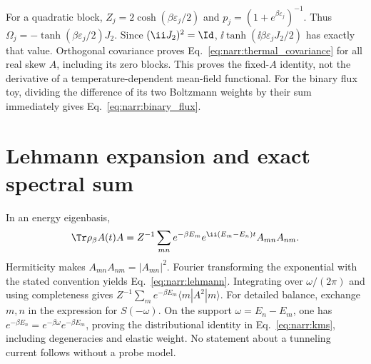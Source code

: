 For a quadratic block, $Z_j=2\cosh(\beta\varepsilon_j/2)$ and
$p_j=(1+e^{\beta\varepsilon_j})^{-1}$. Thus
$\Omega_j=-\tanh(\beta\varepsilon_j/2)J_2$. Since $(\ii J_2)^2=\Id$,
$\ii\tanh(\ii\beta\varepsilon_jJ_2/2)$ has exactly that value.
Orthogonal covariance proves Eq.~\eqref{eq:narr:thermal_covariance} for all
real skew $A$, including its zero blocks. This proves the fixed-$A$ identity,
not the derivative of a temperature-dependent mean-field functional.
For the binary flux toy, dividing the difference of its two Boltzmann weights
by their sum immediately gives Eq.~\eqref{eq:narr:binary_flux}.

\section{Lehmann expansion and exact spectral sum}
\label{app:lehmann_proof}
In an energy eigenbasis,
\begin{equation}
 \Tr\rho_\beta A(t)A=Z^{-1}\sum_{mn}e^{-\beta E_m}
             e^{\ii(E_m-E_n)t}A_{mn}A_{nm}.
\end{equation}
Hermiticity makes $A_{mn}A_{nm}=|A_{mn}|^2$. Fourier transforming the
exponential with the stated convention yields Eq.~\eqref{eq:narr:lehmann}.
Integrating over $\omega/(2\pi)$ and using completeness gives
$Z^{-1}\sum_m e^{-\beta E_m}\langle m|A^2|m\rangle$.
For detailed balance, exchange $m,n$ in the expression for $S(-\omega)$.
On the support $\omega=E_n-E_m$, one has
$e^{-\beta E_n}=e^{-\beta\omega}e^{-\beta E_m}$, proving the distributional
identity in Eq.~\eqref{eq:narr:kms}, including degeneracies and elastic weight.
No statement about a tunneling current follows without a probe model.
